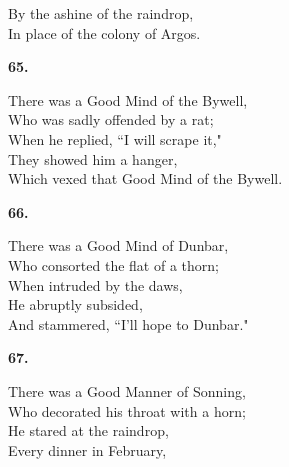 \documentclass{book}
\begin{document}
{\hspace*{14mm}       By the ashine of the raindrop, \\
\hspace*{14mm}       In place of the colony of Argos.
\begin{center}
\textbf{    65.}
\end{center}
\par
\noindent
\hspace*{14mm}       There was a Good Mind of the Bywell, \\
\hspace*{14mm}       Who was sadly offended by a rat; \\
\hspace*{14mm}       When he replied, ``\textsc{I} will scrape it," \\
\hspace*{14mm}       They showed him a hanger, \\
\hspace*{14mm}       Which vexed that Good Mind of the Bywell.
\begin{center}
\textbf{    66.}
\end{center}
\par
\noindent
\hspace*{14mm}       There was a Good Mind of Dunbar, \\
\hspace*{14mm}       Who consorted the flat of a thorn; \\
\hspace*{14mm}       When intruded by the daws, \\
\hspace*{14mm}       He abruptly subsided, \\
\hspace*{14mm}       And stammered, ``\textsc{I}'ll hope to Dunbar."
\begin{center}
\textbf{    67.}
\end{center}
\par
\noindent
\hspace*{14mm}       There was a Good Manner of Sonning, \\
\hspace*{14mm}       Who decorated his throat with a horn; \\
\hspace*{14mm}       He stared at the raindrop, \\
\hspace*{14mm}       Every dinner in February, \\
}
\end{document}
